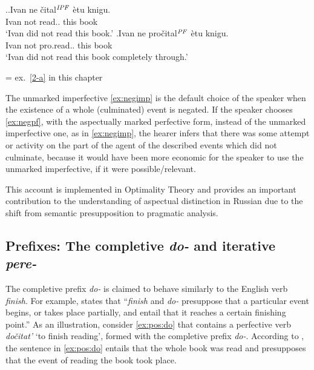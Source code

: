 \ex.\ag.\label{ex:negimp}Ivan ne \v{c}ital$^{\mathit{IPF}}$ \`{e}tu knigu.\\
Ivan not read.. this book\\
\vspace{0.5em}
 `Ivan did not read this book.'
\bg.\label{ex:negpf}Ivan ne pro\v{c}ital$^{\mathit{PF}}$ \`{e}tu knigu.\\
Ivan not pro.read.. this book\\
\vspace{0.5em}
 `Ivan did not read this book completely through.'
 \begin{flushright}
 \vspace{-0.5em}
 = ex.~\ref{2-a} in this chapter
 \end{flushright}

The unmarked imperfective \ref{ex:negimp} is the default choice of the speaker when the existence of a whole (culminated) event is negated.
If the speaker chooses \ref{ex:negpf}, with the aspectually marked perfective form, instead of the unmarked imperfective one, as in \ref{ex:negimp}, the hearer infers that there was some attempt or activity on the part of the agent of the described events which did not culminate, because it would have been more economic for the speaker to use the unmarked imperfective, if it were possible/relevant.

This account is implemented in Optimality Theory \citep{Blutner:00} and provides an important contribution to the understanding of aspectual distinction in Russian due to the shift from semantic presupposition to pragmatic analysis.

\subsection{Prefixes: The completive \textit{do-} and iterative \textit{pere-}}\label{sec:pragm:old:pref}
The completive prefix \textit{do-} is claimed to behave similarly to the English verb \textit{finish}. For example, \citet[75]{Kagan:book} states that ``\textit{finish} and \textit{do-} presuppose that a particular event begins, or takes place partially, and entail that it reaches a certain finishing point.'' As an illustration, consider \ref{ex:pos:do} that contains a perfective verb \textit{do\v{c}itat'} `to finish reading', formed with the completive prefix \textit{do-}. According to \citet{Kagan:book}, the sentence in \ref{ex:pos:do} entails that the whole book was read and presupposes that the event of reading the book took place.

